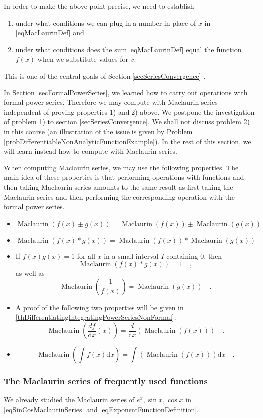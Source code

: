 \documentclass[12pt]{book}
\newcommand{\diff}{\text{d}}
\DeclareMathOperator{\maclaurin}{Maclaurin}
\begin{document}
In order to make the above point precise, we need to establish
\begin{enumerate}
\item under what conditions we can plug in a number in place of $x$ in \eqref{eqMacLaurinDef} and 
\item under what conditions does the sum \eqref{eqMacLaurinDef} equal the function $f(x)$ when we substitute values for $x$. 
\end{enumerate}
This is one of the central goals of Section \ref{secSeriesConvergence} .

In Section \ref{secFormalPowerSeries}, we learned how to carry out operations with formal power series. Therefore we may compute with Maclaurin series independent of proving properties 1) and 2) above. We postpone the investigation of problem 1)  to section \ref{secSeriesConvergence}. We shall not discuss problem 2) in this course (an illustration of the issue is given by Problem \ref{probDifferentiableNonAnalyticFunctionExample}). In the rest of this section, we will learn instead how to compute with Maclaurin series. 

When computing Maclaurin series, we may use the following properties. The main idea of these properties is that performing operations with functions and then taking Maclaurin series amounts to the same result as first taking the Maclaurin series and then performing the corresponding operation with the formal power series. 
\begin{itemize}
\item 
\[
\maclaurin (f(x)\pm g(x))= \maclaurin (f(x))\pm \maclaurin(g(x))
\]
\item 
\[
\maclaurin (f(x)* g(x))= \maclaurin (f(x))* \maclaurin(g(x))
\]
\item If $f(x)g(x)=1$ for all $x$ in a small interval $I$ containing $0$, then 
\[
\maclaurin (f(x)*g(x))= 1\quad, 
\]
as well as
\[
\maclaurin\left(\frac{1}{f(x)}\right)= \maclaurin(g(x))\quad .
\]
\item A proof of the following two properties will be given in \ref{thDifferentiatingIntegratingPowerSeriesNonFormal}.
\[
\maclaurin \left(\frac{df}{\diff x}(x)\right)= \frac{d}{\diff x}\left(\maclaurin(f(x)) \right)\quad .
\]
\item 
\[
\maclaurin \left(\int f(x)\diff x \right) = \int\left( \maclaurin(f(x))\right)\diff x \quad .
\]
\end{itemize}
\subsubsection{The Maclaurin series of frequently used functions}
We already studied the Maclaurin series of $e^x, \sin x, \cos x$ in \eqref{eqSinCosMaclaurinSeries} and \eqref{eqExponentFunctionDefinition}.
\end{document}
